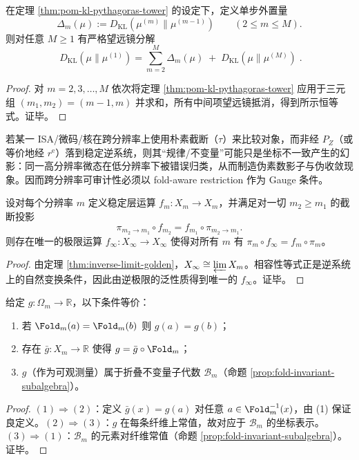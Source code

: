 \begin{corollary}\label{cor:pom-kl-ledger-telescope}
在定理 \ref{thm:pom-kl-pythagoras-tower} 的设定下，定义单步外置量
\[
\Delta_m(\mu):=D_{\mathrm{KL}}(\mu^{(m)}\|\mu^{(m-1)})\qquad(2\le m\le M).
\]
则对任意 $M\ge 1$ 有严格望远镜分解
\[
\boxed{\;
D_{\mathrm{KL}}(\mu\|\mu^{(1)})
=\sum_{m=2}^{M}\Delta_m(\mu)\;+\;D_{\mathrm{KL}}(\mu\|\mu^{(M)})\; }.
\]
\end{corollary}
\begin{proof}
对 $m=2,3,\dots,M$ 依次将定理 \ref{thm:pom-kl-pythagoras-tower} 应用于三元组 $(m_1,m_2)=(m-1,m)$ 并求和，所有中间项望远镜抵消，得到所示恒等式。证毕。
\end{proof}

\begin{remark}\label{rem:pom-gauge-criterion}
若某一 ISA/微码/核在跨分辨率上使用朴素截断（$\tau$）来比较对象，而非经 $P_Z$（或等价地经 $r^{\mathrm{e}}$）落到稳定逆系统，则其“规律/不变量”可能只是坐标不一致产生的幻影：同一高分辨率微态在低分辨率下被错误归类，从而制造伪素数影子与伪收敛现象。因而跨分辨率可审计性必须以 fold-aware restriction 作为 Gauge 条件。
\end{remark}

\begin{theorem}[逆极限自然性]\label{thm:pom-inverse-limit}
设对每个分辨率 $m$ 定义稳定层运算 $f_m:X_m\to X_m$，并满足对一切 $m_2\ge m_1$ 的截断投影
\[
\pi_{m_2\to m_1}\circ f_{m_2}=f_{m_1}\circ \pi_{m_2\to m_1}.
\]
则存在唯一的极限运算 $f_\infty:X_\infty\to X_\infty$ 使得对所有 $m$ 有 $\pi_m\circ f_\infty=f_m\circ \pi_m$。
\end{theorem}
\begin{proof}
由定理 \ref{thm:inverse-limit-golden}，$X_\infty\cong\varprojlim X_m$。相容性等式正是逆系统上的自然变换条件，因此由逆极限的泛性质得到唯一的 $f_\infty$。证毕。
\end{proof}

\begin{proposition}[纤维不变量判别]\label{prop:pom-fiber-invariance}
给定 $g:\Omega_m\to\mathbb{R}$，以下条件等价：
\begin{enumerate}
  \item 若 $\Fold_m(a)=\Fold_m(b)$ 则 $g(a)=g(b)$；
  \item 存在 $\bar g:X_m\to\mathbb{R}$ 使得 $g=\bar g\circ\Fold_m$；
  \item $g$（作为可观测量）属于折叠不变量子代数 $\mathcal{B}_m$（命题 \ref{prop:fold-invariant-subalgebra}）。
\end{enumerate}
\end{proposition}
\begin{proof}
$(1)\Rightarrow(2)$：定义 $\bar g(x)=g(a)$ 对任意 $a\in\Fold_m^{-1}(x)$，由 (1) 保证良定义。$(2)\Rightarrow(3)$：$g$ 在每条纤维上常值，故对应于 $\mathcal{B}_m$ 的坐标表示。$(3)\Rightarrow(1)$：$\mathcal{B}_m$ 的元素对纤维常值（命题 \ref{prop:fold-invariant-subalgebra}）。证毕。
\end{proof}

